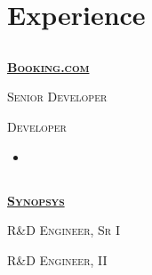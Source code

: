 \documentclass{article}
\begin{document}
\section{Experience}
\subsection[Booking.com]{}
{\raggedright{\textsc{\textbf{\href{https://www.booking.com/}{Booking.com}}}}} \hfill {}

{\raggedright{\textsc{Senior Developer}}} \hfill {}

{\raggedright{\textsc{Developer}}} \hfill {}

\begin{itemize}[noitemsep,nolistsep]
\item <todo: fill in this part>
\end{itemize}

\subsection[Synopsys]{}

{\raggedright{\textsc{\textbf{\href{https://www.synopsys.com/}{Synopsys}}}}} \hfill {}

{\raggedright{\textsc{R\&D Engineer, Sr I}}} \hfill {}

{\raggedright{\textsc{R\&D Engineer, II}}} \hfill {}
\end{document}
